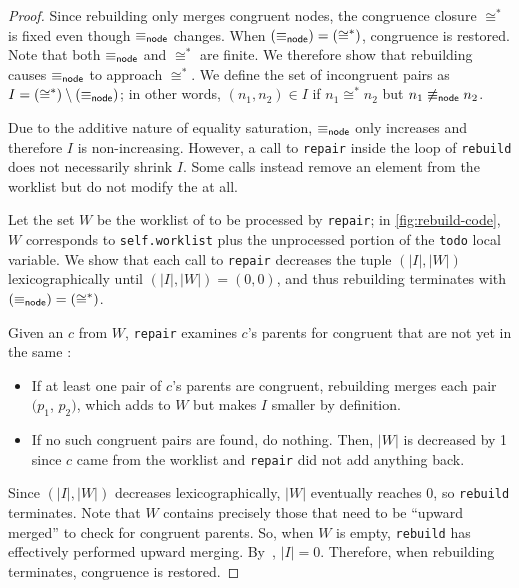 \begin{proof}
  Since rebuilding only merges congruent nodes,
    the congruence closure $\cong^{*}$ is fixed even though $\equiv_{\sf node}$ changes.
  When $(\equiv_{\sf node}) = (\cong^*)$, congruence is restored.
  Note that both $\equiv_{\sf node}$ and $\cong^*$ are finite.
  We therefore show that rebuilding causes $\equiv_{\sf node}$ to approach $\cong^*$.
  We define the set of incongruent \enode pairs as $I = (\cong^*) \setminus (\equiv_{\sf node})$;
  in other words,
    $(n_{1}, n_{2}) \in I$ if $n_{1} \cong^{*} n_{2}$
     but $n_{1} \not\equiv_{\sf node} n_{2}$.

  Due to the additive nature of equality saturation, $\equiv_{\sf node}$ only increases
    and therefore $I$ is non-increasing.
  However, a call to \texttt{repair} inside the loop of \texttt{rebuild} does
    not necessarily shrink $I$.
  Some calls instead remove an element from the worklist but do not modify the
    \egraph at all.

  Let the set $W$ be the worklist of \eclasses to be processed by
    \texttt{repair};
  in \autoref{fig:rebuild-code}, $W$ corresponds to \texttt{self.worklist} plus
    the unprocessed portion of the \texttt{todo} local variable.
  We show that each call to \texttt{repair} decreases the tuple
    $(|I|, |W|)$ lexicographically until $(|I|, |W|) = (0, 0)$,
    and thus rebuilding terminates with $(\equiv_{\sf node}) = (\cong^*)$.


  Given an \eclass $c$ from $W$, \texttt{repair} examines $c$'s parents
    for congruent \enodes that are not yet in the same \eclass:
  \begin{itemize}
    \item If at least one pair of $c$'s parents are congruent,
          rebuilding merges each pair $(p_{1}$, $p_{2})$,
          which adds to $W$ but makes $I$ smaller by definition.
    \item If no such congruent pairs are found, do nothing.
          Then, $|W|$ is decreased by 1 since $c$ came from the
          worklist and \texttt{repair} did not add anything back.
  \end{itemize}

  Since $(|I|, |W|)$ decreases lexicographically,
    $|W|$ eventually reaches $0$, so \texttt{rebuild} terminates.
  Note that $W$ contains precisely those \eclasses that need to be
    ``upward merged'' to check for congruent parents.
  So, when $W$ is empty,
    \texttt{rebuild} has effectively performed upward merging.
  By~\cite[Chapter 7]{nelson}, $|I| = 0$.
Therefore, when rebuilding terminates, congruence is restored.


\end{proof}
